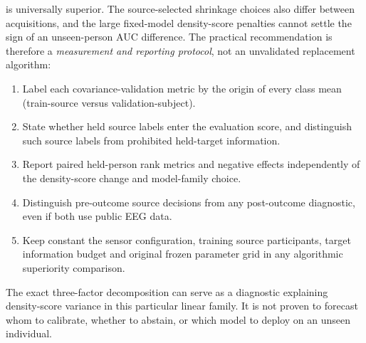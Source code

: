 is universally superior. The source-selected
shrinkage choices also differ between acquisitions,
and the large fixed-model density-score
penalties cannot settle the sign of an
unseen-person AUC difference.
The practical recommendation is therefore a
\emph{measurement and reporting protocol},
not an unvalidated replacement algorithm:
\begin{enumerate}
\item Label each covariance-validation
metric by the origin of every class mean
(train-source versus validation-subject).
\item State whether held source labels enter
the evaluation score, and distinguish such
source labels from prohibited held-target
information.
\item Report paired held-person rank metrics
and negative effects independently of
the density-score change and model-family
choice.
\item Distinguish pre-outcome source
decisions from any post-outcome diagnostic,
even if both use public EEG data.
\item Keep constant the sensor configuration,
training source participants, target information
budget and original frozen parameter grid
in any algorithmic superiority comparison.
\end{enumerate}
The exact three-factor decomposition can serve
as a diagnostic explaining density-score
variance in this particular linear family.
It is not proven to forecast whom to calibrate,
whether to abstain, or which model to deploy
on an unseen individual.

